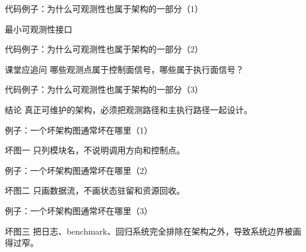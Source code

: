 \begin{frame}{代码例子：为什么可观测性也属于架构的一部分（1）}
\begin{block}{最小可观测性接口}
    {\ttfamily\small
    \par
    \par
    \par
    }
  \end{block}
\end{frame}

\begin{frame}{代码例子：为什么可观测性也属于架构的一部分（2）}
\begin{block}{课堂应追问}
    哪些观测点属于控制面信号，哪些属于执行面信号？
  \end{block}
\end{frame}

\begin{frame}{代码例子：为什么可观测性也属于架构的一部分（3）}
\begin{block}{结论}
    真正可维护的架构，必须把观测路径和主执行路径一起设计。
  \end{block}
\end{frame}

\begin{frame}{例子：一个坏架构图通常坏在哪里（1）}
\begin{block}{坏图一}
    只列模块名，不说明调用方向和控制点。
  \end{block}
\end{frame}

\begin{frame}{例子：一个坏架构图通常坏在哪里（2）}
\begin{block}{坏图二}
    只画数据流，不画状态驻留和资源回收。
  \end{block}
\end{frame}

\begin{frame}{例子：一个坏架构图通常坏在哪里（3）}
\begin{block}{坏图三}
    把日志、benchmark、回归系统完全排除在架构之外，导致系统边界被画得过窄。
  \end{block}
\end{frame}


